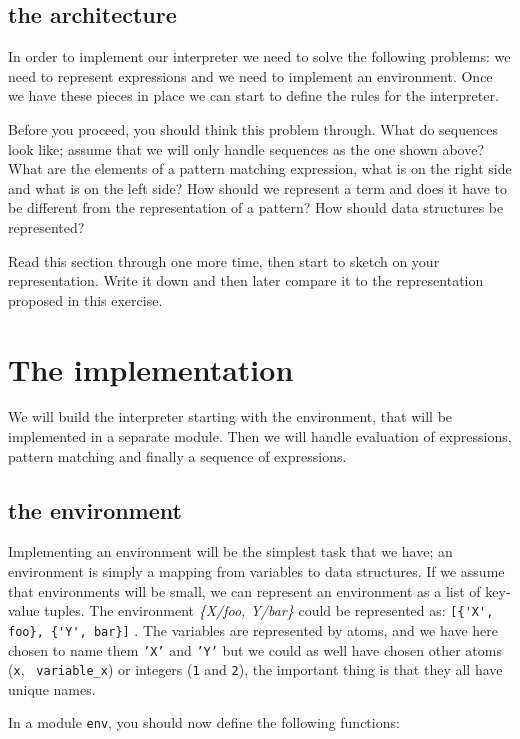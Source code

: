 \documentclass[a4paper,11pt]{article}
\begin{document}
\subsection{the architecture}

In order to implement our interpreter we need to solve the following
problems: we need to represent expressions and we need to implement an
environment. Once we have these pieces in place we can start to define
the rules for the interpreter.

Before you proceed, you should think this problem through. What do
sequences look like; assume that we will only handle sequences as the
one shown above? What are the elements of a pattern
matching expression, what is on the right side and what is on the left
side? How should we represent a term and does it have to be different
from the representation of a pattern? How should data structures be
represented?

Read this section through one more time, then start to sketch on your
representation. Write it down and then later compare it to the
representation proposed in this exercise. 

\section{The implementation}

We will build the interpreter starting with the environment, that will be implemented in a separate module. 
Then we will handle evaluation of expressions, pattern matching and finally a sequence of expressions. 

\subsection{the environment}

Implementing an environment will be the simplest task that we have; an
environment is simply a mapping from variables to data structures. If
we assume that environments will be small, we can represent an
environment as a list of key-value tuples. The environment {\em
  \{X/foo, Y/bar\}} could be represented as:
\verb+[{'X', foo}, {'Y', bar}]+ . The variables are represented by
atoms, and we have here chosen to name them {\tt 'X'} and {\tt 'Y'}
but we could as well have chosen other atoms ({\tt x}, {\tt
  variable\_x}) or integers ({\tt 1} and {\tt 2}), the important thing
is that they all have unique names.

In a module {\tt env}, you should now define the following functions:
\end{document}
